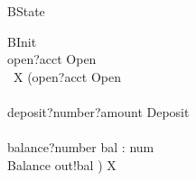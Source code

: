 \documentclass[a4paper,10pt]{article}
\begin{document}
\begin{circusaction}
\circstate BState\\
\end{circusaction}


\begin{circusaction}
\circspot BInit \circseq\\
open?acct \then Open \circseq \\
\circmu~X \circspot (open?acct \then Open\\
\extchoice\\
deposit?number?amount \then Deposit\\
\extchoice\\
balance?number \then \circvar bal : num \\
\circspot Balance \circseq out!bal \then \Skip) \circseq X
\end{circusaction}

\begin{circus}
\circend
\end{circus}
\end{document}
